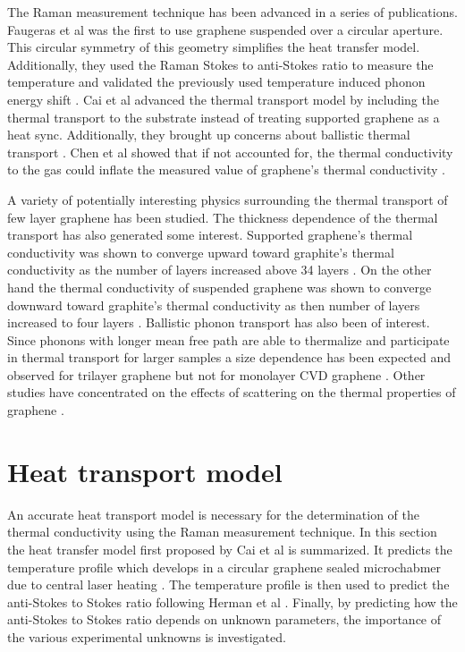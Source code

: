 The Raman measurement technique has been advanced in a series of publications.
Faugeras et al was the first to use graphene suspended over a circular aperture.
This circular symmetry of this geometry simplifies the heat transfer model.
Additionally, they used the Raman Stokes to anti-Stokes ratio to measure the temperature and validated the previously used temperature induced phonon energy shift \cite{Faugeras2010}.
Cai et al advanced the thermal transport model by including the thermal transport to the substrate instead of treating supported graphene as a heat sync.
Additionally, they brought up concerns about ballistic thermal transport \cite{Cai2010}.
Chen et al showed that if not accounted for, the thermal conductivity to the gas could inflate the measured value of graphene's thermal conductivity \cite{Chen2011a}.

A variety of potentially interesting physics surrounding the thermal transport of few layer graphene has been studied.
The thickness dependence of the thermal transport has also generated some interest.
Supported graphene's thermal conductivity was shown to converge upward toward graphite's thermal conductivity as the number of layers increased above 34 layers \cite{Sadeghi2013}.
On the other hand the thermal conductivity of suspended graphene was shown to converge downward toward graphite's thermal conductivity as then number of layers increased to four layers \cite{Ghosh2010}.
Ballistic phonon transport has also been of interest.
Since phonons with longer mean free path are able to thermalize and participate in thermal transport for larger samples a size dependence has been expected and observed for trilayer graphene \cite{Wang2010} but not for monolayer CVD graphene \cite{Chen2011a}.
Other studies have concentrated on the effects of scattering on the thermal properties of graphene \cite{Wang2010,Pettes2011,Jang2013,Chen2012}.

\section{Heat transport model}
An accurate heat transport model is necessary for the determination of the thermal conductivity using the Raman measurement technique.
In this section the heat transfer model first proposed by Cai et al is summarized.
It predicts the temperature profile which develops in a circular graphene sealed microchabmer due to central laser heating \cite{Cai2010}.
The temperature profile is then used to predict the anti-Stokes to Stokes ratio following Herman et al \cite{Herman2011}.
Finally, by predicting how the anti-Stokes to Stokes ratio depends on unknown parameters, the importance of the various experimental unknowns is investigated.

